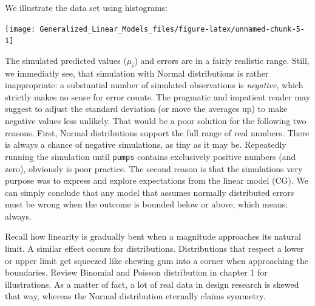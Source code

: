 \documentclass[]{svmono}
\newenvironment{Shaded}{\begin{snugshade}}{\end{snugshade}}
\newcommand{\KeywordTok}[1]{\textcolor[rgb]{0.13,0.29,0.53}{\textbf{#1}}}
\newcommand{\DataTypeTok}[1]{\textcolor[rgb]{0.13,0.29,0.53}{#1}}
\newcommand{\DecValTok}[1]{\textcolor[rgb]{0.00,0.00,0.81}{#1}}
\newcommand{\StringTok}[1]{\textcolor[rgb]{0.31,0.60,0.02}{#1}}
\newcommand{\OperatorTok}[1]{\textcolor[rgb]{0.81,0.36,0.00}{\textbf{#1}}}
\newcommand{\NormalTok}[1]{#1}
\begin{document}
We illustrate the data set using histograms:

\begin{Shaded}
\end{Shaded}

\texttt{[image: Generalized\_Linear\_Models\_files/figure-latex/unnamed-chunk-5-1]}

The simulated predicted values (\(\mu_i\)) and errors are in a fairly
realistic range. Still, we immediatly see, that simulation with Normal
distributions is rather inappropriate: a substantial number of simulated
observations is \emph{negative}, which strictly makes no sense for error
counts. The pragmatic and impatient reader may suggest to adjust the
standard deviation (or move the averages up) to make negative values
less unlikely. That would be a poor solution for the following two
reasons. First, Normal distributions support the full range of real
numbers. There is always a chance of negative simulations, as tiny as it
may be. Repeatedly running the simulation until \texttt{pumps} contains
exclusively positive numbers (and zero), obviously is poor practice. The
second reason is that the simulations very purpose was to express and
explore expectations from the linear model (CG). We can simply conclude
that any model that assumes normally distributed errors must be wrong
when the outcome is bounded below or above, which means: always.

Recall how linearity is gradually bent when a magnitude approaches its
natural limit. A similar effect occurs for distributions. Distributions
that respect a lower or upper limit get squeezed like chewing gum into a
corner when approaching the boundaries. Review Binomial and Poisson
distribution in chapter 1 for illustrations. As a matter of fact, a lot
of real data in design research is skewed that way, whereas the Normal
distribution eternally claims symmetry.
\end{document}
